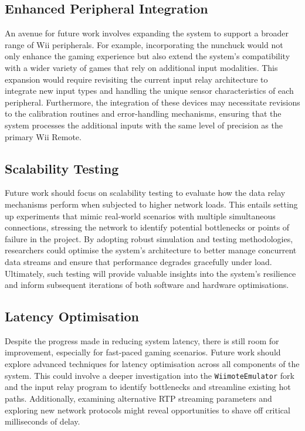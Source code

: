 \subsection{Enhanced Peripheral Integration}
An avenue for future work involves expanding the system to support a broader
range of Wii peripherals. For example, incorporating the nunchuck would not only
enhance the gaming experience but also extend the system's compatibility with a
wider variety of games that rely on additional input modalities. This expansion
would require revisiting the current input relay architecture to integrate new
input types and handling the unique sensor characteristics of each peripheral.
Furthermore, the integration of these devices may necessitate revisions to the
calibration routines and error-handling mechanisms, ensuring that the system
processes the additional inputs with the same level of precision as the primary
Wii Remote.

\subsection{Scalability Testing}
Future work should focus on scalability testing to evaluate how the data relay
mechanisms perform when subjected to higher network loads. This entails setting
up experiments that mimic real-world scenarios with multiple simultaneous
connections, stressing the network to identify potential
bottlenecks or points of failure in the project. By adopting robust simulation and testing
methodologies, researchers could optimise the system’s architecture to better
manage concurrent data streams and ensure that performance degrades gracefully
under load. Ultimately, such testing will provide valuable insights into the
system’s resilience and inform subsequent iterations of both software and
hardware optimisations.

\subsection{Latency Optimisation}
Despite the progress made in reducing system latency, there is still room for
improvement, especially for fast-paced gaming scenarios. Future work should
explore advanced techniques for latency optimisation across all components of
the system. This could involve a deeper investigation into the
\texttt{WiimoteEmulator} fork and the input relay program to identify
bottlenecks and streamline existing hot paths. Additionally, examining
alternative RTP streaming parameters and exploring new network protocols might
reveal opportunities to shave off critical milliseconds of delay.

